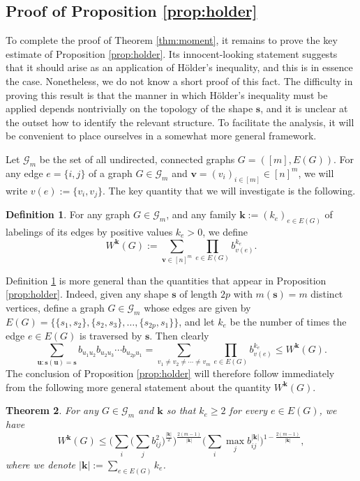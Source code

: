 \documentclass[10pt,reqno]{amsart}
\newtheorem{thm}{Theorem}[section]
\theoremstyle{definition}
\newtheorem{defn}[thm]{Definition}
\numberwithin{equation}{section}
\numberwithin{figure}{section}
\numberwithin{table}{section}
\begin{document}
\subsection{Proof of Proposition \ref{prop:holder}}
\label{sec:holder}

To complete the proof of Theorem \ref{thm:moment}, it remains to prove the 
key estimate of Proposition \ref{prop:holder}. Its innocent-looking 
statement suggests that it should arise as an application of H\"older's 
inequality, and this is in essence the case. Nonetheless, we do not know a 
short proof of this fact. The difficulty in proving this result is that 
the manner in which H\"older's inequality must be applied depends 
nontrivially on the topology of the shape $\mathbf{s}$, and it is unclear 
at the outset how to identify the relevant structure. To facilitate the 
analysis, it will be convenient to place ourselves in a somewhat more 
general framework.

Let $\mathcal{G}_m$ be the set of all undirected, connected graphs 
$G=([m],E(G))$. For any edge $e=\{i,j\}$ of a graph $G\in\mathcal{G}_m$ 
and $\mathbf{v}=(v_i)_{i\in[m]}\in [n]^m$, we will write 
$v(e):=\{v_i,v_j\}$. The key quantity that we will investigate is
the following.

\begin{defn}
\label{defn:wg}
For any graph $G\in\mathcal{G}_m$, and any family $\mathbf{k}:=(k_e)_{e\in 
E(G)}$ of labelings of its edges by positive values $k_e>0$, we define
$$
	W^{\mathbf{k}}(G) := 
	\sum_{\mathbf{v}\in[n]^m}\prod_{e\in E(G)} b_{v(e)}^{k_e}.
$$
\end{defn}

Definition \ref{defn:wg} is more general than the quantities that appear
in Proposition \ref{prop:holder}. Indeed, given any shape 
$\mathbf{s}$ of length $2p$ with $m(\mathbf{s})=m$ distinct vertices, 
define a graph $G\in\mathcal{G}_m$ whose edges are given by
$E(G)=\{\{s_1,s_2\},\{s_2,s_3\},\ldots,\{s_{2p},s_1\}\}$, and let
$k_e$ be the number of times the edge $e\in E(G)$ is traversed by 
$\mathbf{s}$. Then clearly
$$
	\sum_{\mathbf{u}:\mathbf{s}(\mathbf{u})=\mathbf{s}}
	b_{u_1u_2}b_{u_2u_3}\cdots b_{u_{2p}u_1}
	=
	\sum_{v_1\ne v_2\ne\cdots\ne v_m}\prod_{e\in E(G)} b_{v(e)}^{k_e}
	\le W^{\mathbf{k}}(G).
$$
The conclusion of Proposition \ref{prop:holder} will therefore
follow immediately from the following more general statement about
the quantity $W^{\mathbf{k}}(G)$.

\begin{thm}
\label{thm:holder}
For any $G\in\mathcal{G}_m$ and $\mathbf{k}$ so that
$k_e\ge 2$ for every $e\in E(G)$, we have
$$
	W^{\mathbf{k}}(G) \le
	\Bigg(\sum_i\Bigg(\sum_j b_{ij}^2\Bigg)^{\frac{|\mathbf{k}|}{2}}
	\Bigg)^{\frac{2(m-1)}{|\mathbf{k}|}}
	\Bigg(\sum_i \max_j b_{ij}^{|\mathbf{k}|}\Bigg)^{1-
		\frac{2(m-1)}{|\mathbf{k}|}},
$$
where we denote $|\mathbf{k}|:=\sum_{e\in E(G)}k_e$.
\end{thm}
\end{document}
